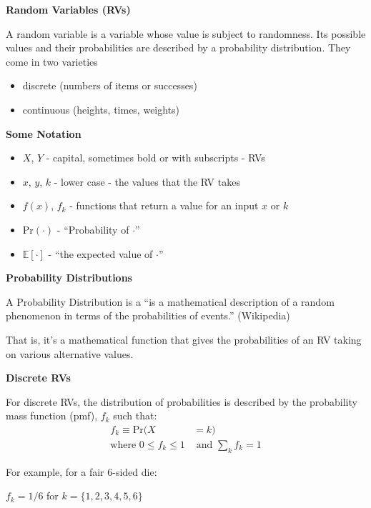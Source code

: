 \documentclass[12pt,xcolor=svgnames]{beamer}
\newcommand{\bl}{\color{blue}}
\newcommand{\theme}{\color{FireBrick}}
\newcommand{\ds}[1]{\mathds{#1}}
\newcommand{\sk}{\vspace{.4cm}}
\newcommand{\nsk}{\vspace{-.4cm}}
\newcommand{\chap}[1]{{\theme \Large \bf #1} \sk}
\newcommand{\E}{\ds{E}}
\newcommand{\pr}{\text{Pr}}
\begin{document}
\begin{frame}
\chap{Random Variables (RVs)}

A random variable is a variable whose value is subject to randomness. Its possible values and their probabilities are described by a probability distribution. They come in two varieties

\begin{itemize}
\item discrete (numbers of items or successes)
\item continuous (heights, times, weights)
\end{itemize}

\end{frame}


\begin{frame}
\chap{Some Notation}

\begin{itemize}
\item $X$, $Y$ - capital, sometimes bold or with subscripts - RVs
\item $x$, $y$, $k$ - lower case - the values that the RV takes
\item $f(x)$, $f_k$ - functions that return a value for an input $x$ or $k$
\item $\pr(\cdot)$ - ``Probability of $\cdot$''
\item $\E[\cdot]$ - ``the expected value of $\cdot$''
\end{itemize}

\end{frame}


\begin{frame}
\chap{Probability Distributions}

A {\bl Probability Distribution} is a ``is a mathematical description of a random phenomenon in terms of the probabilities of events.'' (Wikipedia)

\sk
That is, it's a mathematical function that gives the probabilities of an RV taking on various alternative values. 

\end{frame}



\begin{frame}
\chap{Discrete RVs}

For discrete RVs, the distribution of probabilities is described by the {\bl probability mass function} (pmf), $f_k$ such that:
\begin{align*}
f_k  \equiv \pr(X & = k) \\
\text{where } 0\leq f_k \leq 1 & \text{ and } \sum_k f_k = 1
\end{align*}
\nsk

For example, for a fair 6-sided die:

$f_k = 1/6$ for $k= \{1,2,3,4,5,6\}$

\end{frame}
\end{document}
